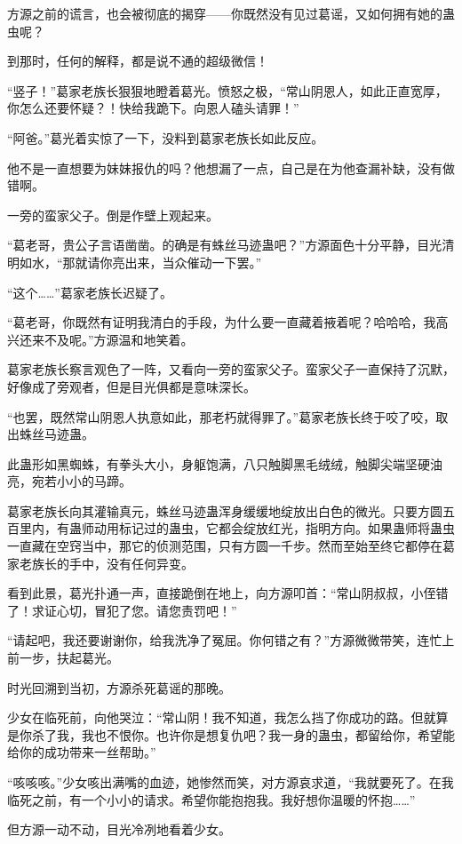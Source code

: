 \begin{this_body}
方源之前的谎言，也会被彻底的揭穿——你既然没有见过葛谣，又如何拥有她的蛊虫呢？

到那时，任何的解释，都是说不通的超级微信！

“竖子！”葛家老族长狠狠地瞪着葛光。愤怒之极，“常山阴恩人，如此正直宽厚，你怎么还要怀疑？！快给我跪下。向恩人磕头请罪！”

“阿爸。”葛光着实惊了一下，没料到葛家老族长如此反应。

他不是一直想要为妹妹报仇的吗？他想漏了一点，自己是在为他查漏补缺，没有做错啊。

一旁的蛮家父子。倒是作壁上观起来。

“葛老哥，贵公子言语凿凿。的确是有蛛丝马迹蛊吧？”方源面色十分平静，目光清明如水，“那就请你亮出来，当众催动一下罢。”

“这个……”葛家老族长迟疑了。

“葛老哥，你既然有证明我清白的手段，为什么要一直藏着掖着呢？哈哈哈，我高兴还来不及呢。”方源温和地笑着。

葛家老族长察言观色了一阵，又看向一旁的蛮家父子。蛮家父子一直保持了沉默，好像成了旁观者，但是目光俱都是意味深长。

“也罢，既然常山阴恩人执意如此，那老朽就得罪了。”葛家老族长终于咬了咬，取出蛛丝马迹蛊。

此蛊形如黑蜘蛛，有拳头大小，身躯饱满，八只触脚黑毛绒绒，触脚尖端坚硬油亮，宛若小小的马蹄。

葛家老族长向其灌输真元，蛛丝马迹蛊浑身缓缓地绽放出白色的微光。只要方圆五百里内，有蛊师动用标记过的蛊虫，它都会绽放红光，指明方向。如果蛊师将蛊虫一直藏在空窍当中，那它的侦测范围，只有方圆一千步。然而至始至终它都停在葛家老族长的手中，没有任何异变。

看到此景，葛光扑通一声，直接跪倒在地上，向方源叩首：“常山阴叔叔，小侄错了！求证心切，冒犯了您。请您责罚吧！”

“请起吧，我还要谢谢你，给我洗净了冤屈。你何错之有？”方源微微带笑，连忙上前一步，扶起葛光。

时光回溯到当初，方源杀死葛谣的那晚。

少女在临死前，向他哭泣：“常山阴！我不知道，我怎么挡了你成功的路。但就算是你杀了我，我也不恨你。也许你是想复仇吧？我一身的蛊虫，都留给你，希望能给你的成功带来一丝帮助。”

“咳咳咳。”少女咳出满嘴的血迹，她惨然而笑，对方源哀求道，“我就要死了。在我临死之前，有一个小小的请求。希望你能抱抱我。我好想你温暖的怀抱……”

但方源一动不动，目光冷冽地看着少女。


\end{this_body}
